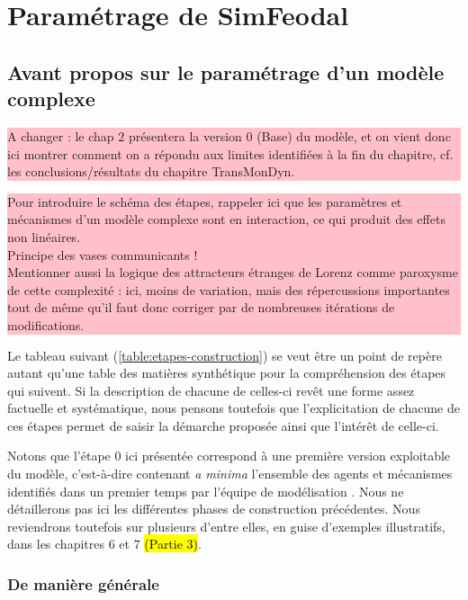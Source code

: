 \clearpage
\section{Paramétrage de SimFeodal}
	
\subsection{Avant propos sur le paramétrage d'un modèle complexe}
	
\colorbox{pink}{\parbox{0.9\textwidth}{%
	\vskip5pt
	A changer : le chap 2 présentera la version 0 (Base) du modèle, et on vient donc ici montrer comment on a répondu aux limites identifiées à la fin du chapitre, cf. les conclusions/résultats du chapitre TransMonDyn.
	\vskip5pt
	}
}
\medbreak
	
\colorbox{pink}{\parbox{0.9\textwidth}{%
	\vskip5pt
	Pour introduire le schéma des étapes, rappeler ici que les paramètres et mécanismes d'un modèle complexe sont en interaction, ce qui produit des effets non linéaires.\\
	Principe des vases communicants !\\
	Mentionner aussi la logique des attracteurs étranges de Lorenz comme paroxysme de cette complexité : ici, moins de variation, mais des répercussions importantes tout de même qu'il faut donc \og corriger\fg{} par de nombreuses itérations de modifications.
	\vskip5pt
	}
}

Le tableau suivant (\cref{table:etapes-construction}) se veut être un point de repère autant qu'une table des matières synthétique pour la compréhension des étapes qui suivent. Si la description de chacune de celles-ci revêt une forme assez factuelle et systématique, nous pensons toutefois que l'explicitation de chacune de ces étapes permet de saisir la démarche proposée ainsi que l'intérêt de celle-ci.

Notons que l'étape 0 ici présentée correspond à une première version \og exploitable\fg{} du modèle, c'est-à-dire contenant \textit{a minima} l'ensemble des agents et mécanismes identifiés dans un premier temps par l'équipe de modélisation \autocite{tannier_ontologie_2014-2}. Nous ne détaillerons pas ici les différentes phases de construction précédentes. Nous reviendrons toutefois sur plusieurs d'entre elles, en guise d'exemples illustratifs, dans les chapitres 6 et 7 \hl{(Partie 3)}.

\subsubsection{De manière générale}
	
